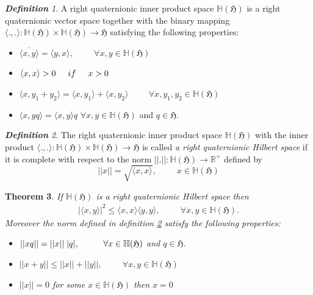 \documentclass[a4paper,12pt,reqno]{amsart}
\theoremstyle{plain}
\newtheorem{theorem}{\bf Theorem}[section]
\theoremstyle{remark}
\newtheorem{definition}[theorem]{\bf Definition}
\begin{document}
	\begin{definition}
		A right quaternionic inner product space $\mathbb{H}(\mathfrak{H})$  is a right quaternionic vector space together with the binary mapping $\langle . , . \rangle : \mathbb{H}(\mathfrak{H}) \times \mathbb{H}(\mathfrak{H}) \to \mathfrak{H}$ satisfying the following properties:
		\begin{itemize}
			\item $\overline{\langle x, y \rangle}= \langle y, x \rangle , \hspace{1cm} \forall x,y \in \mathbb{H}(\mathfrak{H})$
			\item $\langle x, x \rangle > 0 \hspace{0.5cm} if \hspace{0.5cm} x>0$
			\item $\langle x, y_1 +y_2 \rangle = \langle x, y_1 \rangle + \langle x, y_2 \rangle \hspace{1cm} \forall x, y_1, y_2 \in \mathbb{H}(\mathfrak{H})$
			\item $\langle x, yq \rangle = \langle x,y \rangle q$ \hspace{1cm} $\forall x,y \in \mathbb{H}(\mathfrak{H})$ and $q \in \mathfrak{H}$.
		\end{itemize}
	\end{definition}
	
	\begin{definition}\label{b}
		The right quaternionic inner product space $\mathbb{H}(\mathfrak{H})$  with the inner product $\langle . , . \rangle : \mathbb{H}(\mathfrak{H}) \times \mathbb{H}(\mathfrak{H}) \to \mathfrak{H}$ is called \textit{a right quaternionic Hilbert space} if it is complete with respect to the norm $||.|| :\mathbb{H}(\mathfrak{H}) \to \mathbb{R}^+ $ defined by $$||x||= \sqrt{\langle x, x \rangle}, \hspace{1cm} x\in \mathbb{H}(\mathfrak{H})$$ 
	\end{definition}
	
	\begin{theorem}\cite{o}
		If  $\mathbb{H}(\mathfrak{H})$ is a \textit{right quaternionic Hilbert space} then
		\begin{align*}
			{|\langle x, y \rangle|}^2 \leq \langle x, x \rangle \langle y, y \rangle , \hspace{1cm} \forall x, y \in \mathbb{H}(\mathfrak{H}).
		\end{align*}
		Moreover the norm defined in definition \ref{b} satisfy the following properties:
		\begin{itemize}
			\item $||xq||=||x||\hspace{0.1cm} |q|, \hspace{1cm} \forall x \in \mathbb{H}(\mathfrak{H})$ and $q \in \mathfrak{H}.$
			\item $||x+y|| \leq ||x|| + ||y||, \hspace{1cm} \forall x, y \in \mathbb{H}(\mathfrak{H})$
			\item $||x||=0$ for some $x \in \mathbb{H}(\mathfrak{H})$ then $x=0$
		\end{itemize}
	\end{theorem}
	
\end{document}
